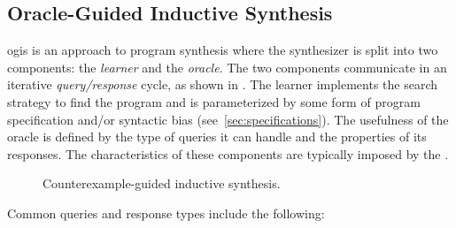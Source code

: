 \subsection{Oracle-Guided Inductive Synthesis}
\label{sec:ogis}

\Acrfull{ogis} is an approach to program synthesis where the synthesizer is
split into two components: the \textit{learner} and the \textit{oracle}. The two
components communicate in an iterative \textit{query/response} cycle, as shown
in . The learner implements the search strategy to
find the program and is parameterized by some form of program specification
and/or syntactic bias (see~\ref{sec:specifications}). The usefulness of the
oracle is defined by the type of queries it can handle and the properties of its
responses. The characteristics of these components are typically imposed by the
.


\begin{figure}
  \centering
  \caption{Counterexample-guided inductive synthesis.}
  \label{fig:cegis}
\end{figure}

Common queries and response types include the following:

